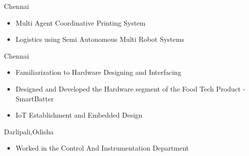\documentclass[10pt,a4paper]{altacv}
\begin{document}

\begin{fullwidth}
\makecvheader 
\end{fullwidth}






  {Chennai}
\begin{itemize}
\item Multi Agent Coordinative Printing System
\item Logistics using Semi Autonomous Multi Robot Systems

\end{itemize}
  {Chennai}
\begin{itemize}
\item  Familiarization to Hardware Designing and Interfacing
\item Designed and Developed the Hardware segment of the Food Tech Product - SmartBatter
\item IoT Establishment and Embedded Design 

\end{itemize}


  {Darlipali,Odisha}
\begin{itemize}
\item Worked in the Control And Instrumentation Department
\end{itemize}
\end{document}
